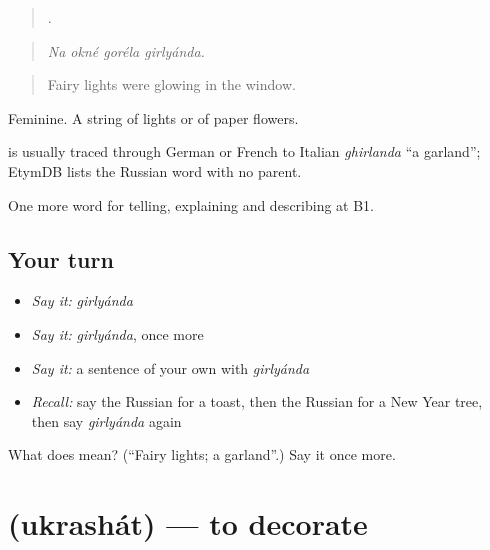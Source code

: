 \begin{quote}
   .
\end{quote}

\begin{quote}
\emph{Na okné goréla girlyánda.}
\end{quote}

\begin{quote}
Fairy lights were glowing in the window.
\end{quote}

Feminine. A string of lights or of paper flowers.

\begin{cousinweb}
\emph{} is usually traced through German or French to Italian \emph{ghirlanda} \textquotedblleft{}a garland\textquotedblright{}; EtymDB lists the Russian word with no parent.
\end{cousinweb}

\begin{grammarlens}[title={What you've built}]
One more word for telling, explaining and describing at B1.
\end{grammarlens}

\subsection*{Your turn}
\begin{itemize}
\raggedright
  \item \emph{Say it:} \emph{girlyánda}
  \item \emph{Say it:} \emph{girlyánda}, once more
  \item \emph{Say it:} a sentence of your own with \emph{girlyánda}
  \item \emph{Recall:} say the Russian for a toast, then the Russian for a New Year tree, then say \emph{girlyánda} again
\end{itemize}

\begin{tcolorbox}[breakable,colback=teal!4,colframe=teal!35!black,title={Before you move on}]
What does  mean? (\textquotedblleft{}Fairy lights; a garland\textquotedblright{}.) Say it once more.
\end{tcolorbox}
\section[\texorpdfstring{\ru{украшать} (ukrashát)}{украшать (ukrashát)}]{ (ukrashát) — to decorate}

